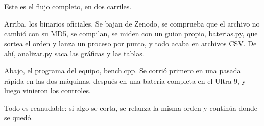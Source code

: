 Este es el flujo completo, en dos carriles.

Arriba, los binarios oficiales. Se bajan de Zenodo, se comprueba que el archivo no cambió con su MD5, se compilan, se miden con un guion propio, baterias.py, que sortea el orden y lanza un proceso por punto, y todo acaba en archivos CSV. De ahí, analizar.py saca las gráficas y las tablas.

Abajo, el programa del equipo, bench.cpp. Se corrió primero en una pasada rápida en las dos máquinas, después en una batería completa en el Ultra 9, y luego vinieron los controles.

Todo es reanudable: si algo se corta, se relanza la misma orden y continúa donde se quedó.
